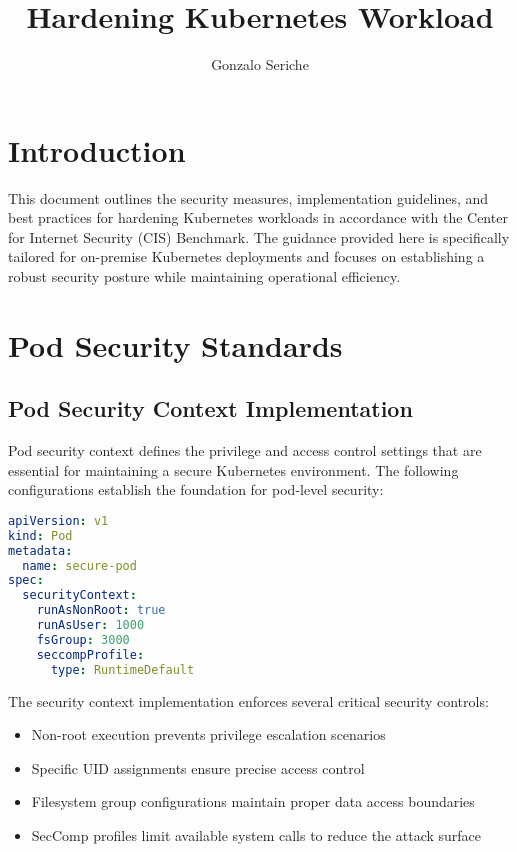 \documentclass[PMO,lsstdraft,authoryear,toc]{lsstdoc}
\title{Hardening Kubernetes Workload}
\author{%
Gonzalo Seriche
}
\date{\vcsDate}
\begin{document}
\maketitle


\section{Introduction}

This document outlines the security measures, implementation guidelines, and best practices for hardening Kubernetes workloads in accordance with the Center for Internet Security (CIS) Benchmark. The guidance provided here is specifically tailored for on-premise Kubernetes deployments and focuses on establishing a robust security posture while maintaining operational efficiency.

\section{Pod Security Standards}

\subsection{Pod Security Context Implementation}

Pod security context defines the privilege and access control settings that are essential for maintaining a secure Kubernetes environment. The following configurations establish the foundation for pod-level security:

\begin{lstlisting}[language=yaml]
apiVersion: v1
kind: Pod
metadata:
  name: secure-pod
spec:
  securityContext:
    runAsNonRoot: true
    runAsUser: 1000
    fsGroup: 3000
    seccompProfile:
      type: RuntimeDefault
\end{lstlisting}

The security context implementation enforces several critical security controls:

\begin{itemize}
    \item Non-root execution prevents privilege escalation scenarios
    \item Specific UID assignments ensure precise access control
    \item Filesystem group configurations maintain proper data access boundaries
    \item SecComp profiles limit available system calls to reduce the attack surface
\end{itemize}
\end{document}
